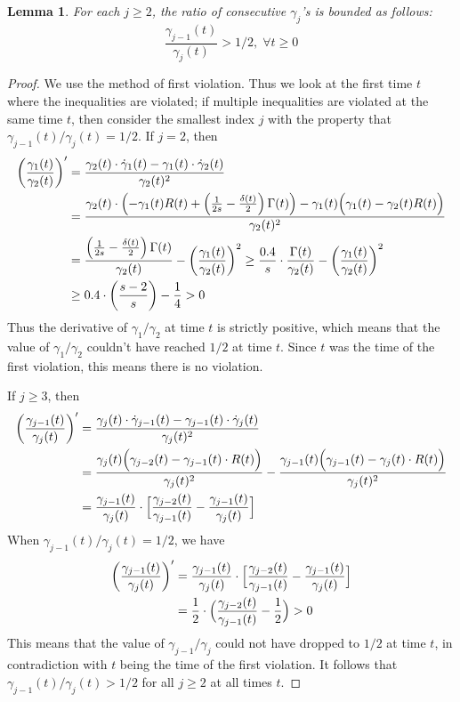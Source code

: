 \documentclass[a4paper,12pt]{article}
\newtheorem{lemma}{Lemma}
\begin{document}
\begin{lemma} \label{gamma_ratio_lb}
For each $j \geq 2$, the ratio of consecutive $\gamma_j$'s is bounded as follows:
$$\frac{\gamma_{j-1}(t)}{\gamma_j(t)} > 1/2, \; \forall t \geq 0$$
\end{lemma}
\begin{proof}
	We use the method of first violation. Thus we look at the first time $t$ where the inequalities are violated; if multiple inequalities are violated at the same time $t$, then consider the smallest index $j$ with the property that $\gamma_{j-1}(t)/\gamma_j(t) = 1/2$.
If $j = 2$, then
\begin{align}
\left(\frac{\gamma_{1}(t)}{\gamma_{2}(t)} \right)' & = \frac{\gamma_2(t) \cdot \dot{\gamma}_1(t) - \gamma_1(t) \cdot \dot{\gamma}_2(t)}{\gamma_2(t)^2} \notag \\
& = \frac{\gamma_2(t) \cdot \Bigl(-\gamma_1(t) R(t) + \left(\frac{1}{2s} - \frac{\delta(t)}{2}\right)\Gamma(t)\Bigr) - \gamma_1(t) \Bigl(\gamma_1(t) - \gamma_2(t) R(t) \Bigr)}{\gamma_2(t)^2} \notag \\
& = \frac{\left(\frac{1}{2s} - \frac{\delta(t)}{2}\right)\Gamma(t)}{\gamma_2(t)} - \left( \frac{\gamma_1(t)}{\gamma_2(t)}\right)^2 \geq \frac{0.4}{s} \cdot \frac{\Gamma(t)}{\gamma_2(t)} - \left( \frac{\gamma_1(t)}{\gamma_2(t)}\right)^2 \notag \\
& \geq 0.4 \cdot \left(\frac{s-2}{s}\right) - \frac{1}{4} > 0
\end{align}
Thus the derivative of $\gamma_1/\gamma_2$ at time $t$ is strictly positive, which means that the value of $\gamma_1/\gamma_2$ couldn't have reached $1/2$ at time $t$. Since $t$ was the time of the first violation, this means there is no violation.

If
$j \geq 3$, then
\begin{align}
\left(\frac{\gamma_{j-1}(t)}{\gamma_j(t)} \right)' & = \frac{\gamma_{j}(t) \cdot \dot{\gamma}_{j-1}(t) - \gamma_{j-1}(t) \cdot \dot{\gamma}_j(t)}{\gamma_j(t)^2} \notag \\
& = \frac{\gamma_j(t)  \Bigl( \gamma_{j-2}(t) - \gamma_{j-1}(t) \cdot R(t)\Bigr)}{\gamma_j(t)^2} - \frac{\gamma_{j-1}(t)  \Bigl( \gamma_{j-1}(t) - \gamma_{j}(t) \cdot R(t)\Bigr)}{\gamma_j(t)^2}  \notag \\
& = \frac{\gamma_{j-1}(t)}{\gamma_j(t)} \cdot \Bigl[ \frac{\gamma_{j-2}(t)}{\gamma_{j-1}(t)} - \frac{\gamma_{j-1}(t)}{\gamma_j(t)} \Bigr]
\end{align}
When $\gamma_{j-1}(t) / \gamma_j(t) = 1/2$, we have
\begin{align}
\left(\frac{\gamma_{j-1}(t)}{\gamma_j(t)} \right)' & = \frac{\gamma_{j-1}(t)}{\gamma_j(t)} \cdot \Bigl[ \frac{\gamma_{j-2}(t)}{\gamma_{j-1}(t)} - \frac{\gamma_{j-1}(t)}{\gamma_j(t)} \Bigr] \notag \\
& = \frac{1}{2} \cdot \Bigl( \frac{\gamma_{j-2}(t)}{\gamma_{j-1}(t)} - \frac{1}{2} \Bigr) > 0
\end{align}
This means that the value of $\gamma_{j-1}/\gamma_j$ could not have dropped to $1/2$ at time $t$, in contradiction with $t$ being the time of the first violation.
It follows that $\gamma_{j-1}(t)/\gamma_j(t) > 1/2$ for all $j \geq 2$ at all times $t$.
\end{proof}
\end{document}

